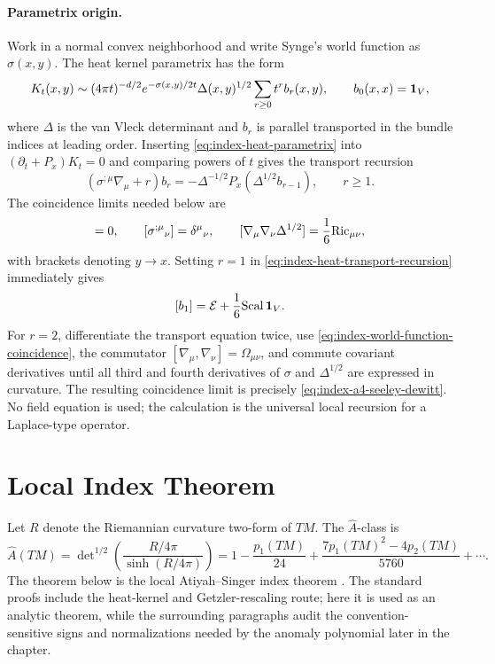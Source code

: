 \paragraph{Parametrix origin.}
Work in a normal convex neighborhood and write Synge's world function as
\(\sigma(x,y)\).  The heat kernel parametrix has the form
\begin{equation}
  K_t(x,y)
  \sim
  (4\pi t)^{-d/2}e^{-\sigma(x,y)/2t}\Delta(x,y)^{1/2}
  \sum_{r\geq0}t^r b_r(x,y),
  \qquad b_0(x,x)={\bf 1}_V,
  \label{eq:index-heat-parametrix}
\end{equation}
where \(\Delta\) is the van Vleck determinant and \(b_r\) is parallel
transported in the bundle indices at leading order.  Inserting
\eqref{eq:index-heat-parametrix} into \((\partial_t+P_x)K_t=0\) and comparing
powers of \(t\) gives the transport recursion
\begin{equation}
  (\sigma^{;\mu}\nabla_\mu+r)b_r
  =
  -\Delta^{-1/2}
  P_x\!\left(\Delta^{1/2}b_{r-1}\right),
  \qquad r\geq1.
  \label{eq:index-heat-transport-recursion}
\end{equation}
The coincidence limits needed below are
\begin{equation}
  [\sigma^{;\mu}]=0,\qquad
  [\sigma^{;\mu}{}_{\nu}]=\delta^\mu{}_\nu,\qquad
  [\nabla_\mu\nabla_\nu\Delta^{1/2}]
  =\frac16{\rm Ric}_{\mu\nu},
  \label{eq:index-world-function-coincidence}
\end{equation}
with brackets denoting \(y\to x\).  Setting \(r=1\) in
\eqref{eq:index-heat-transport-recursion} immediately gives
\[
  [b_1]=\mathcal E+\frac16{\rm Scal}\,{\bf 1}_V .
  \]
For \(r=2\), differentiate the transport equation twice, use
\eqref{eq:index-world-function-coincidence}, the commutator
\([\nabla_\mu,\nabla_\nu]=\Omega_{\mu\nu}\), and commute covariant
derivatives until all third and fourth derivatives of \(\sigma\) and
\(\Delta^{1/2}\) are expressed in curvature.  The resulting coincidence
limit is precisely \eqref{eq:index-a4-seeley-dewitt}.  No field equation is
used; the calculation is the universal local recursion for a Laplace-type
operator.

\section{Local Index Theorem}

Let \(R\) denote the Riemannian curvature two-form of \(TM\).  The
\(\widehat A\)-class is
\[
  \widehat A(TM)
  =
  \det\nolimits^{1/2}
  \left(\frac{R/4\pi}{\sinh(R/4\pi)}\right)
  =
  1-\frac{p_1(TM)}{24}
  +\frac{7p_1(TM)^2-4p_2(TM)}{5760}+\cdots .
\]
The theorem below is the local Atiyah--Singer index theorem
\cite{AtiyahSinger1968,Gilkey1984}.  The standard proofs include the
heat-kernel and Getzler-rescaling route; here it is used as an analytic theorem,
while the surrounding paragraphs audit the convention-sensitive signs and
normalizations needed by the anomaly polynomial later in the chapter.

